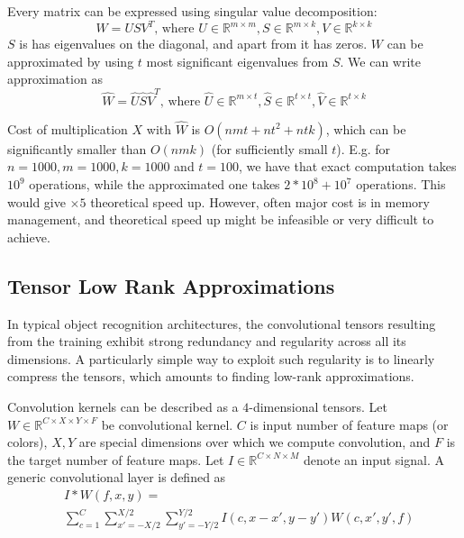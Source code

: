 \documentclass{article}
\begin{document}
Every matrix can be expressed using singular value decomposition:
\begin{equation*}
	W = USV^T\text{, where }U \in \mathbb{R}^{m \times m}, S \in \mathbb{R}^{m \times k}, V \in \mathbb{R}^{k \times k}
\end{equation*}
$S$ is has eigenvalues on the diagonal, and apart from it has zeros. $W$ can be approximated by using $t$ most significant
eigenvalues from $S$. We can write approximation as
\begin{equation*}
	\hat{W} = \hat{U}\hat{S}\hat{V}^T\text{, where }\hat{U} \in \mathbb{R}^{m \times t}, \hat{S} \in \mathbb{R}^{t \times t}, \hat{V} \in \mathbb{R}^{t \times k}
\end{equation*}

Cost of multiplication $X$ with $\hat{W}$ is $O(nmt + nt^2 + ntk)$, which can be significantly smaller than $O(nmk)$ (for sufficiently small $t$). E.g.
for $n = 1000, m = 1000, k = 1000$ and $t = 100$, we have that exact computation takes $10^9$ operations, while the approximated one takes
$2 * 10^8 + 10^7$ operations. This would give $\times 5$ theoretical speed up. However, often major cost is in memory management, 
and theoretical speed up might be infeasible or very difficult to achieve. 


\subsection{Tensor Low Rank Approximations}

In typical object recognition architectures, the convolutional tensors resulting
from the training exhibit strong redundancy and regularity across all its 
dimensions. A particularly simple way to exploit such regularity is to 
linearly compress the tensors, which amounts to finding low-rank 
approximations.

Convolution kernels can be described as a $4$-dimensional tensors. Let $W \in \mathbb{R}^{C \times X \times Y \times F}$ 
be convolutional kernel. 
$C$ is input number of feature maps (or colors), $X, Y$ are special dimensions
over which we compute convolution, and $F$ is the target number of feature maps.
Let $I \in \mathbb{R}^{C \times N \times M}$ denote an input signal.
A generic convolutional layer is defined as
\begin{align*}
\label{convlayereq}
&I \ast W (f,x,y) = \\
&\sum_{c=1}^C \sum_{x'=-X/2}^{X/2} \sum_{y'=-Y/2}^{Y/2} I(c,x-x',y-y') W(c,x',y',f)
\end{align*}
\end{document}
